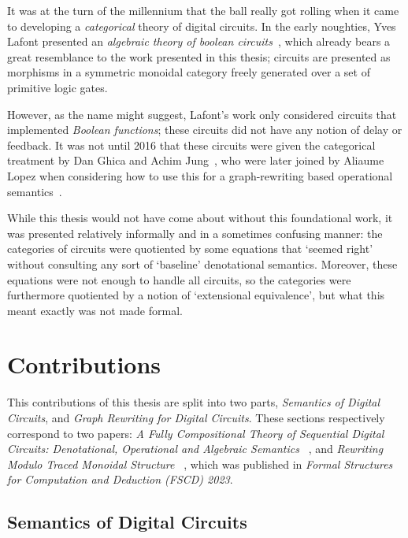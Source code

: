 It was at the turn of the millennium that the ball really got rolling when it
came to developing a \emph{categorical} theory of digital circuits.
In the early noughties, Yves Lafont presented an
\emph{algebraic theory of boolean circuits}~\cite{lafont2003algebraic}, which
already bears a great resemblance to the work presented in this thesis; circuits
are presented as morphisms in a symmetric monoidal category freely generated
over a set of primitive logic gates.

However, as the name might suggest, Lafont's work only considered circuits that
implemented \emph{Boolean functions}; these circuits did not have any notion of
delay or feedback.
It was not until 2016 that these circuits were given the categorical treatment
by Dan Ghica and Achim Jung~\cite{ghica2016categorical}, who were later joined
by Aliaume Lopez when considering how to use this for a graph-rewriting based
operational semantics~\cite{ghica2017diagrammatic}.

While this thesis would not have come about without this foundational work, it
was presented relatively informally and in a sometimes confusing manner:
the categories of circuits were quotiented by some equations that `seemed right'
without consulting any sort of `baseline' denotational semantics.
Moreover, these equations were not enough to handle all circuits, so the
categories were furthermore quotiented by a notion of `extensional equivalence',
but what this meant exactly was not made formal.

\section{Contributions}

This contributions of this thesis are split into two parts,
\emph{Semantics of Digital Circuits}, and
\emph{Graph Rewriting for Digital Circuits}.
These sections respectively correspond to two papers:
\emph{%
    A Fully Compositional Theory of Sequential Digital Circuits:
    Denotational, Operational and Algebraic Semantics%
}~\cite{ghica2024fully}, and \emph{%
    Rewriting Modulo Traced Monoidal Structure%
}~\cite{ghica2023rewriting}, which was published in
\emph{Formal Structures for Computation and Deduction (FSCD) 2023}.

\subsection{Semantics of Digital Circuits}

